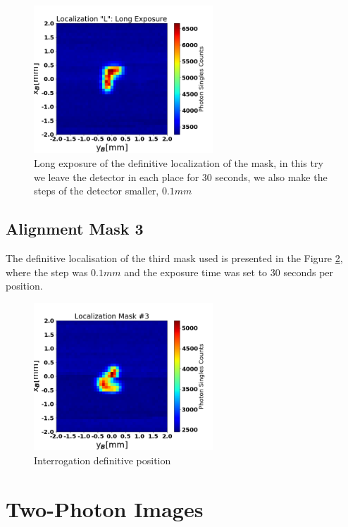 \begin{figure}[h!]
\centering
\includegraphics[width=0.6\textwidth]{Figures/localizationLLong.png} 
\caption{Long exposure of the definitive localization of the mask, in this try we leave the 
detector in each place for 30 seconds, we also make the steps of the detector smaller, $0.1mm$}
\label{fig:localizationDef}
\end{figure}
\subsection{Alignment Mask 3}

The definitive localisation of the third mask used is presented in the Figure \ref{fig:localizationInte}, 
where the step was $0.1mm$ and the exposure time was set to 30 seconds per position.

\begin{figure}[h!]
\centering
\includegraphics[width=0.6\textwidth]{Figures/interrogationLocation.png} 
\caption{Interrogation definitive position}
\label{fig:localizationInte}
\end{figure}


\section{Two-Photon Images}


